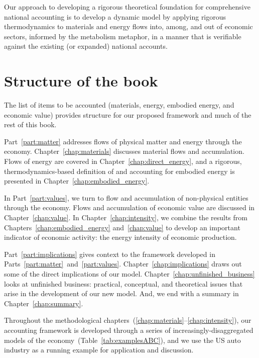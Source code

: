 Our approach to developing a rigorous theoretical foundation for 
comprehensive national accounting is to
develop a dynamic model 
by applying rigorous thermodynamics 
to materials and energy flows into, among, 
and out of economic sectors,
informed by the metabolism metaphor,
in a manner that is verifiable against 
the existing (or expanded) 
national accounts.


\section{Structure of the book}
\label{sec:structure}

The list of items to be accounted 
(materials, energy, embodied energy, and economic value)
provides structure for our proposed framework
and much of the rest of this book.

Part~\ref{part:matter} addresses flows of physical matter and energy
through the economy.
Chapter~\ref{chap:materials} discusses material flows and accumulation.
Flows of energy are covered in Chapter~\ref{chap:direct_energy}, 
and a rigorous, thermodynamics-based definition of and accounting for 
embodied energy is presented in Chapter~\ref{chap:embodied_energy}.

In Part~\ref{part:values}, we turn to flow and accumulation of 
non-physical entities through the economy. 
Flows and accumulation of economic value are discussed in Chapter~\ref{chap:value}.
In Chapter~\ref{chap:intensity}, we combine the results from 
Chapters~\ref{chap:embodied_energy} and~\ref{chap:value} to
develop an important indicator of economic activity:
the energy intensity of economic production.

Part~\ref{part:implications} gives context to the framework developed in
Parts~\ref{part:matter}~and~\ref{part:values}.
Chapter~\ref{chap:implications} draws out some of the direct implications
of our model.
Chapter~\ref{chap:unfinished_business} looks at 
unfinished business: practical, conceptual, and theoretical issues
that arise in the development of our new model.
And, we end with a summary in Chapter~\ref{chap:summary}.

Throughout the methodological chapters~(\ref{chap:materials}--\ref{chap:intensity}),
our accounting framework is developed
through a series of increasingly-disaggregated
models of the economy~(Table~\ref{tab:examplesABC}),
and we use the US auto industry 
as a running example for application and discussion.

